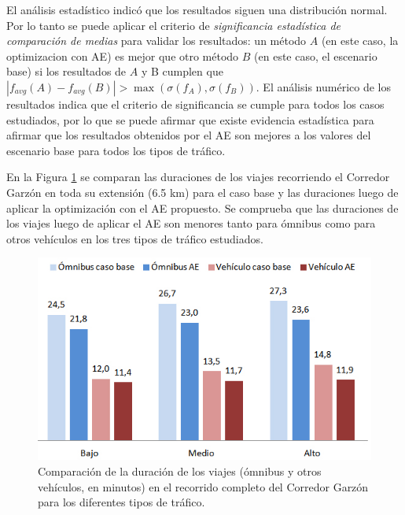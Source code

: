El análisis estadístico 
indicó que los resultados 
siguen una distribución normal. Por lo tanto se puede aplicar el criterio de \textit{significancia estadística de comparación de medias} para validar los resultados:
un método $A$ (en este caso, la optimizacion con AE) es mejor que otro método $B$ (en este caso, el escenario base) si los resultados de $A$ y B cumplen que 
$
\left |f_{avg}(A) - f_{avg}(B)  \right | > \max(\sigma(f_A),\sigma(f_B))
$.
%
El análisis numérico de los resultados indica que el criterio de significancia se cumple para todos los casos estudiados, por lo que se puede afirmar que existe evidencia estadística para afirmar que los resultados obtenidos por el AE son mejores a los valores del escenario base para todos los tipos de tráfico.

En la Figura \ref{fig:duracion_viajes} se comparan las duraciones de los viajes recorriendo el Corredor Garzón en toda su extensión (6.5 km) para el caso base y las duraciones luego de aplicar la optimización con el AE propuesto. Se comprueba que las duraciones de los viajes luego de aplicar el AE son menores tanto para ómnibus como para otros vehículos en los tres tipos de tráfico estudiados.
 
\begin{figure}[!h]
	\centering
	\includegraphics[width=0.8\linewidth]{Figures/duracion_viajes}
	\caption[Comparación de la duración de los viajes en el escenario base y al aplicar el AE.]{Comparación de la duración de los viajes (ómnibus y otros vehículos, en minutos) en el recorrido completo del Corredor Garzón para los diferentes tipos de tráfico.
}
	\label{fig:duracion_viajes}
\end{figure}


